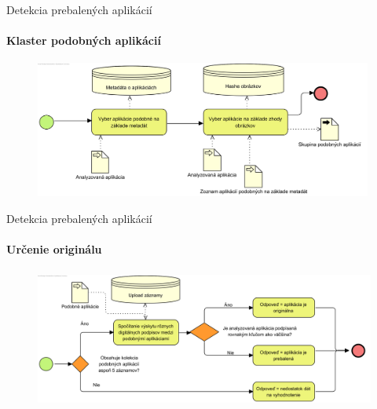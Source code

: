 \documentclass{beamer}
\begin{document}
  \begin{frame}[label=lists]{Detekcia prebalených aplikácií}
 	 \framesubtitle{Klaster podobných aplikácií}
		\begin{figure}[htb]
	  	\begin{center}
    		\includegraphics[height=4.5cm]{images/detection-cluster.png}
  		\end{center}
	\end{figure}
  \end{frame}   
  
  \begin{frame}[label=lists]{Detekcia prebalených aplikácií}
 	 \framesubtitle{Určenie originálu}
		\begin{figure}[htb]
	  	\begin{center}
    		\includegraphics[height=4.5cm]{images/detection-original.png}
  		\end{center}
	\end{figure}
  \end{frame}    
  
\end{document}
